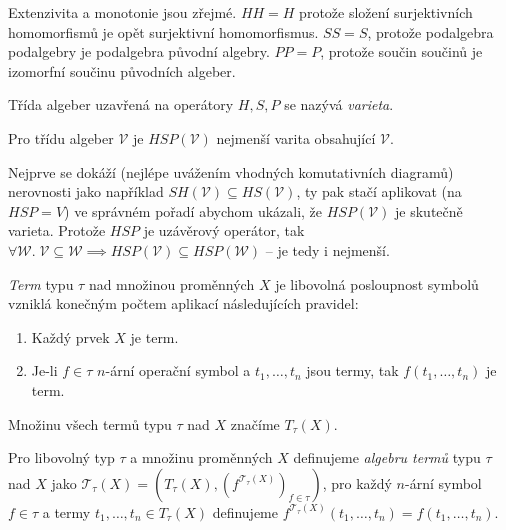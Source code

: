Extenzivita a monotonie jsou zřejmé. $HH = H$ protože složení
surjektivních homomorfismů je opět surjektivní homomorfismus.
$SS = S$, protože podalgebra podalgebry je podalgebra původní algebry.
$PP = P$, protože součin součinů je izomorfní součinu původních algeber.

\begin{definition}
    Třída algeber uzavřená na operátory $H, S, P$ se nazývá
    {\em varieta}.
\end{definition}

\begin{theorem}
    Pro třídu algeber $\mathcal{V}$ je
    $HSP(\mathcal{V})$ nejmenší varita obsahující $\mathcal{V}$.
\end{theorem}

Nejprve se dokáží (nejlépe uvážením vhodných komutativních diagramů)
nerovnosti jako například
$SH(\mathcal{V}) \subseteq HS(\mathcal{V})$,
ty pak stačí aplikovat (na $HSP = V$) ve správném pořadí abychom ukázali, že
$HSP(\mathcal{V})$ je skutečně varieta. Protože $HSP$ je uzávěrový
operátor, tak
$\forall \mathcal{W}. \; \mathcal{V} \subseteq \mathcal{W} \implies
HSP(\mathcal{V}) \subseteq HSP(\mathcal{W})$ -- je tedy i nejmenší.

\begin{definition}[Term]
{\em Term} typu $\tau$ nad množinou proměnných $X$ je libovolná
posloupnost symbolů vzniklá konečným počtem aplikací následujících
pravidel:
\begin{enumerate}
    \item Každý prvek $X$ je term.
    \item Je-li $f \in \tau$ $n$-ární operační symbol a $t_1, \ldots, t_n$
        jsou termy, tak $f(t_1, \ldots, t_n)$ je term.
\end{enumerate}
\noindent
Množinu všech termů typu $\tau$ nad $X$ značíme $T_\tau(X)$.
\end{definition}

\begin{example}
\end{example}

\begin{definition}
Pro libovolný typ $\tau$ a množinu proměnných $X$ definujeme
{\em algebru termů} typu $\tau$ nad $X$ jako
$\mathcal{T}_\tau(X) = (T_\tau(X), (f^{\mathcal{T}_\tau(X)})_{f \in \tau})$,
pro každý $n$-ární symbol $f \in \tau$ a termy
$t_1, \ldots, t_n \in T_\tau(X)$ definujeme
\linebreak
$f^{\mathcal{T}_\tau(X)}(t_1, \ldots, t_n) = f(t_1, \ldots, t_n)$.
\end{definition}


